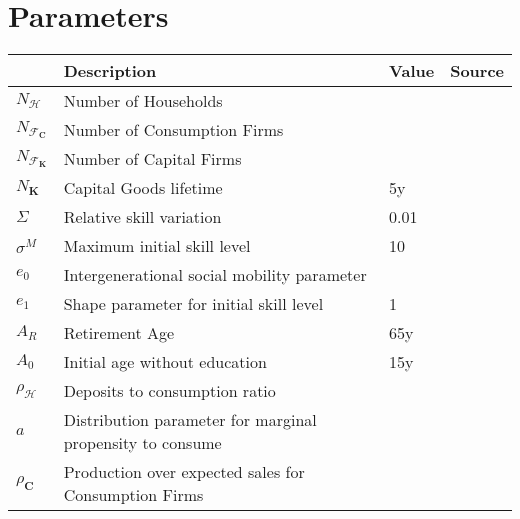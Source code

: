 \documentclass[a4paper, headings=standardclasses]{scrartcl}
\begin{document}

\section{Parameters}

\begin{tabularx}{\linewidth}{lXll}
    \toprule
                                 & Description                                                  & Value & Source \\
    \midrule
    $N_\mathcal{H}$              & Number of Households                                         &       &        \\
    $N_{\mathcal{F}_\mathbf{C}}$ & Number of Consumption Firms                                  &       &        \\
    $N_{\mathcal{F}_\mathbf{K}}$ & Number of Capital Firms                                      &       &        \\
    $N_{\mathbf{K}}$             & Capital Goods lifetime                                       & 5y    &        \\
    $\Sigma$                     & Relative skill variation                                     & 0.01  &        \\
    $\sigma^M$                   & Maximum initial skill level                                  & 10    &        \\
    $e_0$                        & Intergenerational social mobility parameter                  &       &        \\
    $e_1$                        & Shape parameter for initial skill level                      & 1     &        \\
    $A_R$                        & Retirement Age                                               & 65y   &        \\
    $A_0$                        & Initial age without education                                & 15y   &        \\
    $\rho_\mathcal{H}$           & Deposits to consumption ratio                                &       &        \\
    $a$                          & Distribution parameter for marginal propensity to consume    &       &        \\
    $\rho_\mathbf{C}$            & Production over expected sales for Consumption Firms         &       &        \\

\end{tabularx}
\end{document}
